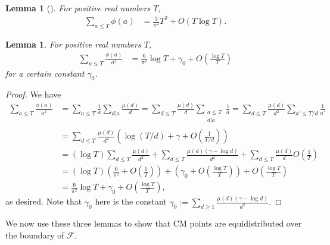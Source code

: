 \documentclass[11pt,letterpaper,reqno]{amsart}
\newtheorem{lemma}[theorem]{Lemma}
\numberwithin{equation}{section}
\numberwithin{figure}{section}
\numberwithin{table}{section}
\newcommand{\lrp}[1]{\left(#1\right)}
\newcommand{\FF}{\mathcal{F}}
\begin{document}
\begin{lemma}[{\cite[p. 399]{niven-zuckerman-montgomery}}] \label{lem:sum-phi}
    For positive real numbers $T$,
    \begin{align}
        \sum_{a \le T} \phi(a) &= \frac{3}{\pi^2} T^2 + O(T \log T).
    \end{align}
\end{lemma}


\begin{lemma} \label{lem:sum-phi-over-a2}
    For positive real numbers $T$,
    \begin{align}
        \sum_{a \le T} \frac{\phi(a)}{a^2} &= \frac{6}{\pi^2} \log T + \gamma_0 + O\lrp{\frac{\log T}{T}} 
    \end{align}
    for a certain constant $\gamma_0$.
\end{lemma}
\begin{proof}
    We have 
    \begin{align}
        \sum_{a \le T} \frac{\phi(a)}{a^2} &= \sum_{a \le T} \frac{1}{a} \sum_{d|a} \frac{\mu(d)}{d} = \sum_{d \le T} \frac{\mu(d)}{d} \sum_{\substack{a \le T \\ d|a}} \frac{1}{a} = \sum_{d \le T} \frac{\mu(d)}{d^2} \sum_{a' \le T/d } \frac{1}{a'}  \\
        &= \sum_{d \le T} \frac{\mu(d)}{d^2} \lrp{\log (T/d) + \gamma + O\lrp{\frac{1}{T/d}} }
        \\
        &= (\log T) \sum_{d \le T} \frac{\mu(d)}{d^2} + \sum_{d \le T} \frac{\mu(d)(\gamma-\log d)}{d^2} + \sum_{d \le T} \frac{\mu(d)}{d} O\lrp{\frac1T}
        \\
        &= (\log T)\lrp{\frac{6}{\pi^2} + O\lrp{\frac1T}} + \lrp{\gamma_0 + O\lrp{\frac{\log T}{T}}} + O\lrp{\frac{\log T}{T}} \\
        &= \frac{6}{\pi^2} \log T + \gamma_0 + O\lrp{\frac{\log T}{T}},
    \end{align}
    as desired.
    Note that $\gamma_0$ here is the constant
    $\displaystyle
        \gamma_0 := \sum_{d \ge 1} \frac{\mu(d)(\gamma-\log d)}{d^2}.
    $
\end{proof}




We now use these three lemmas to show that CM points are equidistributed over the boundary of $\FF$.
\end{document}
